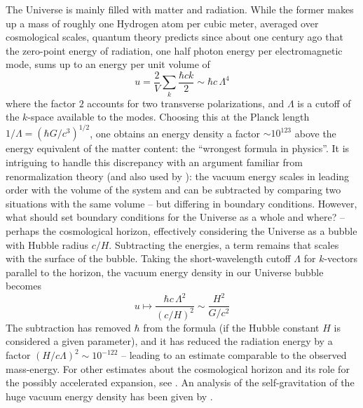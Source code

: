 \documentclass[11pt, oneside]{article}   	%
\begin{document}
The Universe is mainly filled with matter and radiation. While the former makes up
a mass of roughly one Hydrogen atom per cubic meter, averaged over cosmological scales,
quantum theory predicts since about one century ago
that the zero-point energy of radiation, one half photon energy
per electromagnetic mode, sums up to an energy per unit volume of
\citep{Adler_1995}
$$
u = \frac{2}{V} \sum_{k} \frac{\hbar c k}{2} \sim \hbar c \, \Lambda^4
$$
where the factor $2$ accounts for two transverse polarizations, and 
$\Lambda$ is a cutoff of the $k$-space available to the modes. 
Choosing this at the Planck length $1/\Lambda = (\hbar G/c^3)^{1/2}$,
one obtains an energy density a factor $\sim 10^{123}$ above the energy equivalent of
the matter content: the ``wrongest formula in physics''. 
It is intriguing to handle this discrepancy with an argument familiar from 
renormalization theory (and also used by \citet{Casimir_1948b}): 
the vacuum energy scales in leading order
with the volume of the system and can be subtracted by comparing two situations with 
the same volume -- but differing in boundary conditions. However, what should set 
boundary conditions for the Universe as a whole and where? -- perhaps the cosmological 
horizon, effectively considering
the Universe as a bubble with Hubble radius $c/H$. Subtracting the energies, a term 
remains that scales with the surface of the bubble. Taking the short-wavelength cutoff
$\Lambda$ for $k$-vectors parallel to the horizon, the vacuum energy density
in our Universe bubble becomes
$$
u \mapsto \frac{ \hbar c \, \Lambda^2 }{ (c/H)^2 } \sim \frac{ H^2 }{ G / c^2 }
$$
The subtraction has removed $\hbar$ from the formula (if the Hubble constant $H$ 
is considered a given parameter), and it has reduced the radiation energy by a factor 
$(H / c \Lambda)^2 \sim 10^{-122}$ -- leading to an estimate
comparable to the observed mass-energy. For other estimates about
the cosmological horizon and its role for the possibly accelerated expansion,
see \citet{Easson_2011}. An analysis of the self-gravitation of the huge vacuum energy
density has been given by \citet{Wang_2017c}.
\end{document}
